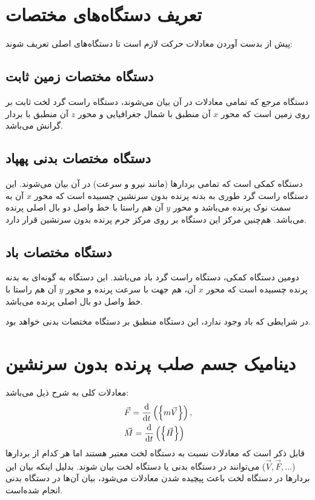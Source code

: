 \section{تعریف دستگاه‌های مختصات}
پیش از بدست آوردن معادلات حرکت لازم است تا دستگاه‌های اصلی تعریف شوند:
\subsection{دستگاه مختصات زمین ثابت}
دستگاه مرجع که تمامی معادلات در آن بیان می‌شوند، دستگاه راست گرد لخت ثابت بر روی زمین است که محور $x$ آن منطبق با شمال جغرافیایی و محور $z$ آن منطبق با بردار گرانش می‌باشد.
\subsection{دستگاه مختصات بدنی پهپاد}
دستگاه کمکی است که تمامی بردارها (مانند نیرو و سرعت) در آن بیان می‌شوند. این دستگاه راست گرد طوری به بدنه پرنده بدون سرنشین چسبیده است که محور $x$ آن به سمت نوک پرنده می‌باشد و محور $y$ آن هم راستا با خط واصل دو بال اصلی پرنده می‌باشد. هم‌چنین مرکز این دستگاه بر روی مرکز جرم پرنده بدون سرنشین قرار دارد.
\subsection{دستگاه مختصات باد}
دومین دستگاه کمکی، دستگاه راست گرد باد می‌باشد.
این دستگاه به گونه‌ای به بدنه پرنده چسبیده است که محور $x$ آن، هم جهت با سرعت پرنده و محور $y$ آن هم راستا با خط واصل دو بال اصلی پرنده می‌باشد.

در شرایطی که باد وجود ندارد، این دستگاه منطبق بر دستگاه مختصات بدنی خواهد بود.
\section{دینامیک جسم صلب پرنده بدون سرنشین}
معادلات کلی به شرح ذیل می‌باشد\cite{Nik}:
\begin{subequations}
\begin{align}
& \vec{F}={\frac {\rm d}{{\rm d}t}} \left(  \left\{ { m \vec{V} } \right\} \right), \label{E4} \\
& \vec{M}={\frac {\rm d}{{\rm d}t}} \left(  \left\{ \vec{H} \right\}  \right)
\end{align}
\end{subequations}
قابل ذکر است که معادلات نسبت به دستگاه لخت معتبر هستند اما هر کدام از بردارها  ($\vec{V},\vec{F},...$)  می‌توانند در دستگاه بدنی یا دستگاه لخت بیان شوند.
بدلیل اینکه بیان این بردارها در دستگاه لخت باعث پیچیده شدن معادلات می‌شود، بیان آن‌ها در دستگاه بدنی انجام شده‌است.

